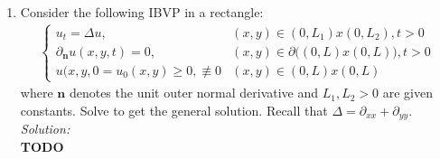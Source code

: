 \documentclass[10pt]{amsart}
\theoremstyle{nonumberplain}
\begin{document}
\begin{enumerate}[label={\bf {\arabic*}:}]
\begin{enumerate}
\end{enumerate}

\newpage

\item Consider the following IBVP in a rectangle: \\
\begin{align*}
\begin{cases}
u_t = \Delta u, &(x, y) \in (0, L_1)x(0, L_2), t > 0 \\
\partial_{\bm n} u(x, y, t) = 0, &(x, y) \in \partial \big( (0, L)x(0, L) \big), t > 0\\
u(x, y, 0 = u_0(x, y) \geq 0, \not \equiv 0 &(x, y) \in (0, L)x(0, L)
\end{cases}
\end{align*}
where $\bm n$ denotes the unit outer normal derivative and $L_1, L_2 > 0$ are given constants.
Solve to get the general solution.
Recall that $\Delta = \partial_{xx} + \partial_{yy}$. \\
\textit{Solution:} \\
\textbf{TODO} \\

\end{enumerate}
\end{document}
